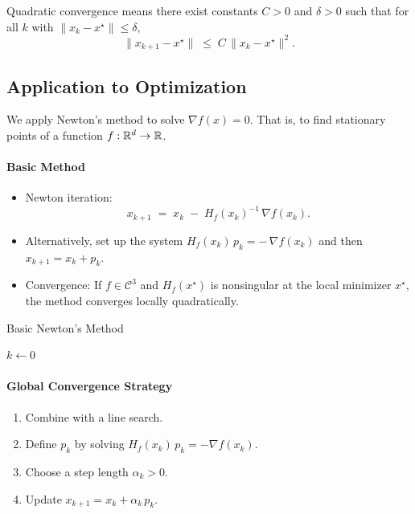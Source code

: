 \begin{remark}
    Quadratic convergence means there exist constants \(C>0\) and \(\delta>0\) such that for all \(k\) with \(\|x_k - x^\star\|\le \delta\),
    \[
        \|x_{k+1} - x^\star\| \;\le\; C \,\|x_k - x^\star\|^2.
    \]
\end{remark}

\subsection*{Application to Optimization}

We apply Newton's method to solve \(\nabla f(x) = 0\). That is, to find stationary points of a function \(f:\mathbb{R}^d \to \mathbb{R}\).

\paragraph{Basic Method}
\begin{itemize}
    \item Newton iteration:
    \[
      x_{k+1} \;=\; x_k \;-\; H_f(x_k)^{-1} \,\nabla f(x_k).
    \]
    \item Alternatively, set up the system \(H_f(x_k)\,p_k = -\,\nabla f(x_k)\) and then \(x_{k+1} = x_k + p_k\).
    \item Convergence: If \(f\in \mathcal{C}^3\) and \(H_f(x^\star)\) is nonsingular at the local minimizer \(x^\star\), the method converges locally quadratically.
\end{itemize}

\begin{algorithm}[H]
\caption{Basic Newton's Method}
\label{alg:newton-basic}
$k \gets 0$\;
\;
\end{algorithm}

\paragraph{Global Convergence Strategy}
\begin{enumerate}
    \item Combine with a line search.
    \item Define \(p_k\) by solving \(H_f(x_k)\,p_k = -\nabla f(x_k)\).
    \item Choose a step length \(\alpha_k > 0\).
    \item Update \(x_{k+1} = x_k + \alpha_k \, p_k\).
\end{enumerate}

